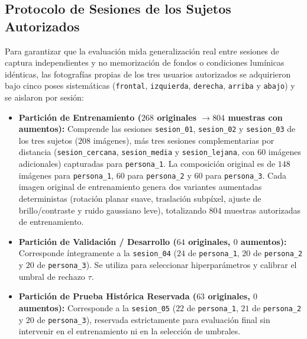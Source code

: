 \documentclass{article}
\begin{document}
\subsection{Protocolo de Sesiones de los Sujetos Autorizados}
Para garantizar que la evaluación mida generalización real entre sesiones de captura independientes y no memorización de fondos o condiciones lumínicas idénticas, las fotografías propias de los tres usuarios autorizados se adquirieron bajo cinco poses sistemáticas (\texttt{frontal}, \texttt{izquierda}, \texttt{derecha}, \texttt{arriba} y \texttt{abajo}) y se aislaron por sesión:
\begin{itemize}
    \item \textbf{Partición de Entrenamiento ($268$ originales $\to 804$ muestras con aumentos):} Comprende las sesiones \texttt{sesion\_01}, \texttt{sesion\_02} y \texttt{sesion\_03} de los tres sujetos ($208$ imágenes), más tres sesiones complementarias por distancia (\texttt{sesion\_cercana}, \texttt{sesion\_media} y \texttt{sesion\_lejana}, con $60$ imágenes adicionales) capturadas para \texttt{persona\_1}. La composición original es de $148$ imágenes para \texttt{persona\_1}, $60$ para \texttt{persona\_2} y $60$ para \texttt{persona\_3}. Cada imagen original de entrenamiento genera dos variantes aumentadas deterministas (rotación planar suave, traslación subpíxel, ajuste de brillo/contraste y ruido gaussiano leve), totalizando $804$ muestras autorizadas de entrenamiento.
    \item \textbf{Partición de Validación / Desarrollo ($64$ originales, $0$ aumentos):} Corresponde íntegramente a la \texttt{sesion\_04} ($24$ de \texttt{persona\_1}, $20$ de \texttt{persona\_2} y $20$ de \texttt{persona\_3}). Se utiliza para seleccionar hiperparámetros y calibrar el umbral de rechazo $\tau$.
    \item \textbf{Partición de Prueba Histórica Reservada ($63$ originales, $0$ aumentos):} Corresponde a la \texttt{sesion\_05} ($22$ de \texttt{persona\_1}, $21$ de \texttt{persona\_2} y $20$ de \texttt{persona\_3}), reservada estrictamente para evaluación final sin intervenir en el entrenamiento ni en la selección de umbrales.
\end{itemize}
\end{document}
